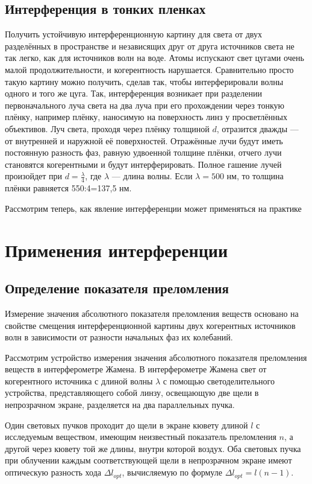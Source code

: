 \documentclass[a4paper, 12pt]{extarticle}
\begin{document}
  \subsection{Интерференция в тонких пленках}
  Получить устойчивую интерференционную картину для света от двух разделённых в пространстве и
  независящих друг от друга источников света не так легко, как для источников волн на воде. Атомы
  испускают свет цугами очень малой продолжительности, и когерентность нарушается. Сравнительно
  просто такую картину можно получить, сделав так, чтобы интерферировали волны одного и того же
  цуга. Так, интерференция возникает при разделении первоначального луча света на два луча при
  его прохождении через тонкую плёнку, например плёнку, наносимую на поверхность линз у
  просветлённых объективов. Луч света, проходя через плёнку толщиной $d$, отразится дважды — от
  внутренней и наружной её поверхностей. Отражённые лучи будут иметь постоянную разность фаз, равную
  удвоенной толщине плёнки, отчего лучи становятся когерентными и будут интерферировать. Полное
  гашение лучей произойдет при $d = \frac{\lambda}{4}$, где $\lambda$ — длина волны. Если $\lambda = 500$ нм,
  то толщина плёнки равняется 550:4=137,5 нм.

  Рассмотрим теперь, как явление интерференции может применяться на практике

  \section{Применения интерференции}

  \subsection{Определение показателя преломления}
  Измерение значения абсолютного показателя преломления веществ основано на свойстве смещения
  интерференционной картины двух когерентных источников волн в зависимости от разности начальных фаз
  их колебаний.

  Рассмотрим устройство измерения значения абсолютного показателя преломления веществ в
  интерферометре Жамена. В интерферометре
  Жамена свет от когерентного источника с длиной волны $\lambda$ с помощью светоделительного устройства,
  представляющего собой линзу, освещающую две щели в непрозрачном экране, разделяется на два
  параллельных пучка. 

  Один световых пучков проходит до щели в экране кювету длиной $l$ с исследуемым веществом, имеющим
  неизвестный показатель преломления $n$, а другой через кювету той же длины, внутри которой воздух.
  Оба световых пучка при облучении каждым соответствующей щели в непрозрачном экране имеют
  оптическую разность хода $\Delta l_{opt}$, вычисляемую по формуле $\Delta l_{opt}=l (n-1)$.
  
\end{document}
